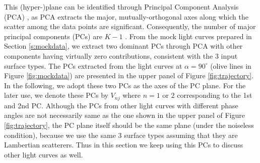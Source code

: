 \documentclass[iop,numberedappendix,apj,]{emulateapj}
\def\memoYF#1{\color{red}[YF: {\bf #1}]\color{black}}
\def\memoJLY#1{\color{green}[JLY: {\bf #1}]\color{black}}
\def\memoNBC#1{\color{blue}[NBC: {\bf #1}]\color{black}}
\begin{document}
This (hyper-)plane can be identified through Principal Component Analysis (PCA) \citep{Cowan2009,Cowan2011}, as PCA extracts the major, mutually-orthogonal axes along which the scatter among the data points are significant. 
Consequently, the number of major principal components (PCs) are $K-1$ \citep{Cowan2011}. 
From the mock light curves prepared in Section \ref{s:mockdata}, we extract two dominant PCs through PCA with other components having virtually zero contributions, consistent with the 3 input surface types.  
The PCs extracted from the light curves at $\alpha = 90^{\circ }$ (olive lines in Figure \ref{fig:mockdata}) are presented in the upper panel of Figure \ref{fig:trajectory}. 
In the following, we adopt these two PCs as the axes of the PC plane. 
For the later use, we denote these PCs by $V_{nj}$ where $n=1$ or $2$  corresponding to the 1st and 2nd PC. 
Although the PCs from other light curves with different phase angles are not necessarily same as the one shown in the upper panel of Figure \ref{fig:trajectory}, the PC plane itself should be the same plane (under the noiseless condition), because we use the same 3 surface types assuming that they are Lambertian scatterers. 
Thus in this section we keep using this PCs to discuss other light curves as well. 
\end{document}
